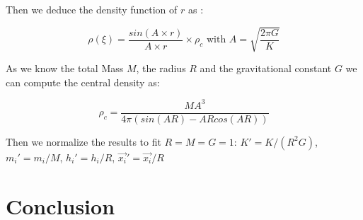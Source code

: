 Then we deduce the density function of $r$ as :

$$\rho(\xi) = \frac{sin(A\times r)}{A \times r} \times \rho_c \mbox{ with } A = \sqrt{\frac{2\pi G}{K}}
$$

As we know the total Mass $M$, the radius $R$ and the gravitational constant $G$ we can compute the central density as: 

$$ \rho_c = \frac{M A^3}{4 \pi (sin(AR)-ARcos(AR)) } $$

Then we normalize the results to fit $R = M = G = 1$: $K' = K/(R^2G) $, $m_i' = m_i/M $, $h_i' = h_i / R$, $\vec{x_i}' = \vec{x_i}/R$ 

\section{Conclusion}
